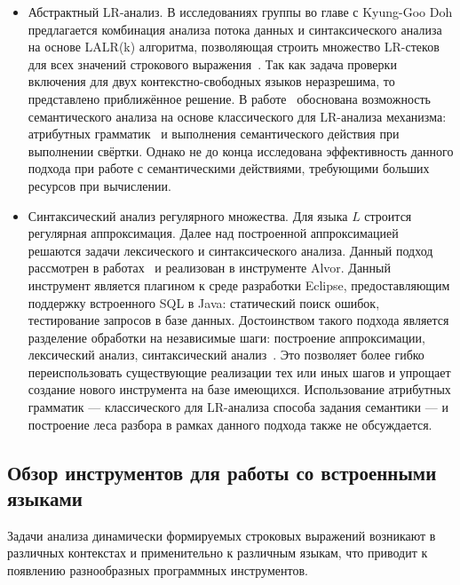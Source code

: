 \begin{itemize}
    \item Абстрактный LR-анализ. В исследованиях группы во главе  с Kyung-Goo Doh предлагается комбинация анализа потока данных и синтаксического анализа на основе LALR(k) алгоритма, позволяющая строить множество LR-стеков для всех значений строкового выражения~\cite{LrAbstract1, LrAbstract2, LRAbstractParsingSema}. Так как задача проверки включения для двух контекстно-свободных языков неразрешима, то представлено приближённое решение. В работе~\cite{LRAbstractParsingSema} обоснована возможность семантического анализа на основе классического для LR-анализа механизма: атрибутных грамматик~\cite{Dragon} и выполнения семантического действия при выполнении свёртки. Однако не до конца исследована эффективность данного подхода при работе с семантическими действиями, требующими больших ресурсов при вычислении.

    \item Синтаксический анализ регулярного множества. Для языка $L$ строится регулярная аппроксимация. Далее над построенной аппроксимацией решаются задачи лексического и синтаксического анализа. Данный подход рассмотрен в работах~\cite{Alvor1, Alvor2} и реализован в инструменте Alvor. Данный инструмент является плагином к среде разработки Eclipse, предоставляющим поддержку встроенного SQL в Java: статический поиск ошибок, тестирование запросов в базе данных. Достоинством такого подхода является разделение обработки на независимые шаги: построение аппроксимации, лексический анализ, синтаксический анализ~\cite{Alvor2}. Это позволяет более гибко переиспользовать существующие реализации тех или иных шагов и упрощает создание нового инструмента на базе имеющихся. Использование атрибутных грамматик --- классического для LR-анализа способа задания семантики --- и построение леса разбора в рамках данного подхода также не обсуждается.

\end{itemize}


\subsection{Обзор инструментов для работы со встроенными языками}\label{SELToolsDescr}

    Задачи анализа динамически формируемых строковых выражений возникают в различных контекстах и применительно к различным языкам, что приводит к появлению разнообразных программных инструментов.

